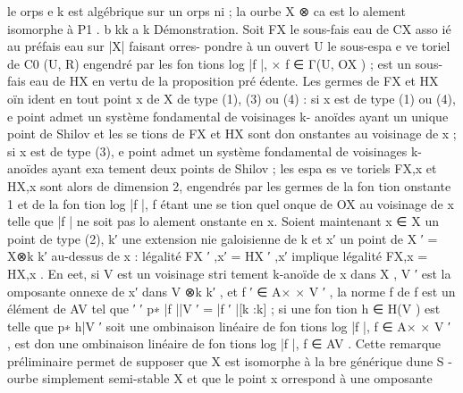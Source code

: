 \documentclass[
  10pt,
]{article}
\newenvironment{Shaded}{}{}
\newcommand{\NormalTok}[1]{#1}
\begin{document}
\begin{Shaded}
\begin{Highlighting}[]
\NormalTok{      le orps e}
\NormalTok{               k est algébrique sur un orps ni ;}
\NormalTok{      la ourbe X ⊗  ca est lo alement isomorphe à P1 .}
\NormalTok{                  b kk                               a        k}
\NormalTok{Démonstration. Soit FX le sous{-}fais eau de CX asso ié au préfais eau sur |X| faisant orres{-}}
\NormalTok{pondre à un ouvert U le sous{-}espa e ve toriel de C0 (U, R) engendré par les fon tions log |f |,}
\NormalTok{               ×}
\NormalTok{f ∈ Γ(U, OX      ) ; \textquotesingle{}est un sous{-}fais eau de HX en vertu de la proposition pré édente. Les germes}
\NormalTok{de FX et HX oïn ident en tout point x de X de type (1), (3) ou (4) :}
\NormalTok{     si x est de type (1) ou (4), e point admet un système fondamental de voisinages k{-}}
\NormalTok{       anoïdes ayant un unique point de Shilov et les se tions de FX et HX sont don}
\NormalTok{        onstantes au voisinage de x ;}
\NormalTok{     si x est de type (3), e point admet un système fondamental de voisinages k{-}anoïdes}
\NormalTok{       ayant exa tement deux points de Shilov ; les espa es ve toriels FX,x et HX,x sont alors}
\NormalTok{       de dimension 2, engendrés par les germes de la fon tion onstante 1 et de la fon tion}
\NormalTok{       log |f |, f étant une se tion quel onque de OX au voisinage de x telle que |f | ne soit pas}
\NormalTok{       lo alement onstante en x.}
\NormalTok{    Soient maintenant x ∈ X un point de type (2), k′ une extension nie galoisienne de k et x′ un}
\NormalTok{point de X ′ = X⊗k k′ au{-}dessus de x : l\textquotesingle{}égalité FX ′ ,x′ = HX ′ ,x′ implique l\textquotesingle{}égalité FX,x = HX,x .}
\NormalTok{En eet, si V est un voisinage stri tement k{-}anoïde de x dans X , V ′ est la omposante}
\NormalTok{ onnexe de x′ dans V ⊗k k′ , et f ′ ∈ A×                                                        ×}
\NormalTok{                                                    V ′ , la norme f de f est un élément de AV tel que}
\NormalTok{                                                                              ′}
\NormalTok{                      ′}
\NormalTok{p∗ |f ||V ′ = |f ′ |[k :k] ; si une fon tion h ∈ H(V ) est telle que p∗ h|V ′ soit une ombinaison linéaire}
\NormalTok{de fon tions log |f |, f ∈ A×                                                                           ×}
\NormalTok{                                    V ′ , \textquotesingle{}est don une ombinaison linéaire de fon tions log |f |, f ∈ AV .}
\NormalTok{Cette remarque préliminaire permet de supposer que X est isomorphe à la bre générique}
\NormalTok{d\textquotesingle{}une S {-} ourbe simplement semi{-}stable X et que le point x orrespond à une omposante}

\end{Highlighting}
\end{Shaded}
\end{document}
